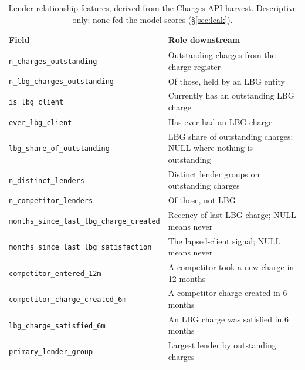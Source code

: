 \documentclass[    author={Samuel Menon Demelo; Sneha Saphala Ram Prasad; 
Viktor Ander Lindholm; Vishal Khatri},
               supervisor={Prof. Fernando Moreno-Pino},
                   degree={MSc},
                    title={Lloyds Commercial Banking Intelligence},
                 subtitle={Ranking SME Lending, Risk and Growth Prospects for Lloyds Banking Group},
                     type={},
                     year={2026}]{dissertation}
\begin{document}
\begin{collapsable}
\begin{table}[htbp]
\centering
\small
\caption[Lender-relationship features]{Lender-relationship features, derived from the Charges API harvest.
Descriptive only: none fed the model scores (\S\ref{sec:leak}).}
\label{tab:lender-fields}
\begin{tabular}{@{}lp{7.4cm}@{}}
\toprule
\textbf{Field} & \textbf{Role downstream} \\
\midrule
\texttt{n\_charges\_outstanding}
    & Outstanding charges from the charge register \\
\texttt{n\_lbg\_charges\_outstanding}
    & Of those, held by an LBG entity \\
\texttt{is\_lbg\_client}
    & Currently has an outstanding LBG charge \\
\texttt{ever\_lbg\_client}
    & Has ever had an LBG charge \\
\texttt{lbg\_share\_of\_outstanding}
    & LBG share of outstanding charges; NULL where nothing is outstanding \\
\texttt{n\_distinct\_lenders}
    & Distinct lender groups on outstanding charges \\
\texttt{n\_competitor\_lenders}
    & Of those, not LBG \\
\texttt{months\_since\_last\_lbg\_charge\_created}
    & Recency of last LBG charge; NULL means never \\
\texttt{months\_since\_last\_lbg\_satisfaction}
    & The lapsed-client signal; NULL means never \\
\texttt{competitor\_entered\_12m}
    & A competitor took a new charge in 12 months \\
\texttt{competitor\_charge\_created\_6m}
    & A competitor charge created in 6 months \\
\texttt{lbg\_charge\_satisfied\_6m}
    & An LBG charge was satisfied in 6 months \\
\texttt{primary\_lender\_group}
    & Largest lender by outstanding charges \\
\bottomrule
\end{tabular}
\end{table}
\end{collapsable}
\end{document}
